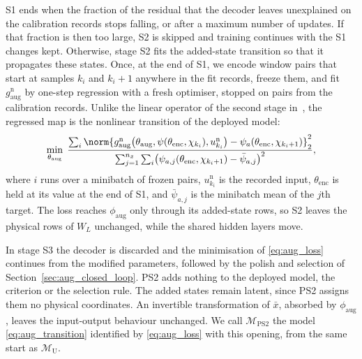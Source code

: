 S1 ends when the fraction of the residual that the decoder leaves unexplained
on the calibration records stops falling, or after a maximum number of
updates.
If that fraction is then too large, S2 is skipped and training continues
with the S1 changes kept.
Otherwise, stage S2 fits the added-state transition so that it propagates
these states.
Once, at the end of S1, we encode window pairs that start at samples $k_i$
and $k_i+1$ anywhere in the fit records, freeze them, and fit
$g^{\mathrm n}_{\mathrm{aug}}$ by one-step regression with a fresh optimiser,
stopped on pairs from the calibration records.
Unlike the linear operator of the second stage
in~\cite{hefny2015supervised}, the regressed map is the nonlinear transition
of the deployed model:
\begin{equation}
 \min_{\theta_{\mathrm{aug}}}\;
 \frac{\sum_{i}\norm{g^{\mathrm n}_{\mathrm{aug}}\bigl(\theta_{\mathrm{aug}},
   \psi(\theta_{\mathrm{enc}},\chi_{k_i}),u^{\mathrm n}_{k_i}\bigr)
   -\psi_a(\theta_{\mathrm{enc}},\chi_{k_i+1})}_2^2}
 {\sum_{j=1}^{n_{\bar x}}\sum_{i}\bigl(\psi_{a,j}(\theta_{\mathrm{enc}},\chi_{k_i+1})-\bar\psi_{a,j}\bigr)^2},
 \label{eq:ps2_s2}
\end{equation}
where $i$ runs over a minibatch of frozen pairs, $u^{\mathrm n}_{k_i}$ is the
recorded input, $\theta_{\mathrm{enc}}$ is held at its value at the end of S1,
and $\bar\psi_{a,j}$ is the minibatch mean of the $j$th target.
The loss reaches $\phi_{\mathrm{aug}}$ only through its added-state rows, so
S2 leaves the physical rows of $W_L$ unchanged, while the shared hidden layers
move.

In stage S3 the decoder is discarded and the minimisation of
\eqref{eq:aug_loss} continues from the modified parameters, followed by the
polish and selection of Section~\ref{sec:aug_closed_loop}.
PS2 adds nothing to the deployed model, the criterion or the selection rule.
The added states remain latent, since PS2 assigns them no physical
coordinates.
An invertible transformation of $\bar x$, absorbed by $\phi_{\mathrm{aug}}$,
leaves the input-output behaviour unchanged.
We call $\mathcal M_{\mathrm{PS2}}$ the model \eqref{eq:aug_transition}
identified by \eqref{eq:aug_loss} with this opening, from the same start as
$\mathcal M_{\mathrm U}$.
